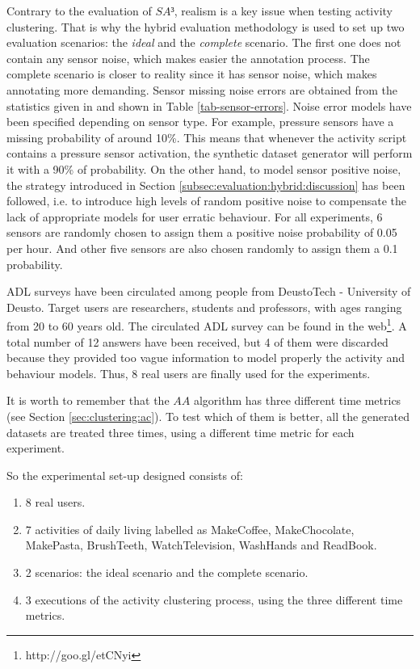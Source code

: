Contrary to the evaluation of $SA³$, realism is a key issue when testing activity clustering. That is why the hybrid evaluation methodology is used to set up two evaluation scenarios: the \textit{ideal} and the \textit{complete} scenario. The first one does not contain any sensor noise, which makes easier the annotation process. The complete scenario is closer to reality since it has sensor noise, which makes annotating more demanding. Sensor missing noise errors are obtained from the statistics given in \cite{Chen2012a} and shown in Table \ref{tab-sensor-errors}. Noise error models have been specified depending on sensor type. For example, pressure sensors have a missing probability of around 10\%. This means that whenever the activity script contains a pressure sensor activation, the synthetic dataset generator will perform it with a 90\% of probability. On the other hand, to model sensor positive noise, the strategy introduced in Section \ref{subsec:evaluation:hybrid:discussion} has been followed, i.e. to introduce high levels of random positive noise to compensate the lack of appropriate models for user erratic behaviour. For all experiments, 6 sensors are randomly chosen to assign them a positive noise probability of 0.05 per hour. And other five sensors are also chosen randomly to assign them a 0.1 probability. 

ADL surveys have been circulated among people from DeustoTech - University of Deusto. Target users are researchers, students and professors, with ages ranging from 20 to 60 years old. The circulated ADL survey can be found in the web\footnote{http://goo.gl/etCNyi}. A total number of 12 answers have been received, but 4 of them were discarded because they provided too vague information to model properly the activity and  behaviour models. Thus, 8 real users are finally used for the experiments. 

It is worth to remember that the $AA$ algorithm has three different time metrics (see Section \ref{sec:clustering:ac}). To test which of them is better, all the generated datasets are treated three times, using a different time metric for each experiment.

So the experimental set-up designed consists of: 

\begin{enumerate}
 \item 8 real users.
 \item 7 activities of daily living labelled as MakeCoffee, MakeChocolate, MakePasta, BrushTeeth, WatchTelevision, WashHands and ReadBook. 
 \item 2 scenarios: the ideal scenario and the complete scenario.
 \item 3 executions of the activity clustering process, using the three different time metrics.
\end{enumerate}

